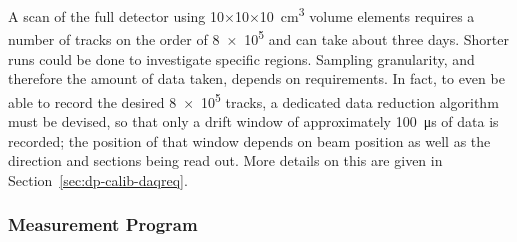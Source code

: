 A scan of the full detector using \num{10}$\times$\num{10}$\times$\SI{10}{\cubic\cm} volume elements requires a number of tracks on the order of \num{8e5} 
and can take about three days. Shorter runs could be done to investigate specific regions. Sampling granularity, and therefore the amount of data taken, depends on  requirements. In fact, to even be able to record the desired \num{8e5} tracks, a dedicated data reduction algorithm must be devised, so that only a drift window of approximately \SI{100}{\micro\s}
of data is recorded; the position of that window depends on beam position as well as the direction and  sections being read out. More details on this are given in Section~\ref{sec:dp-calib-daqreq}.







\subsubsection{Measurement Program}
\label{sec:dp-calib-sys-las-ion-meas}



